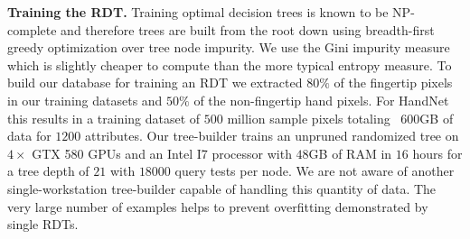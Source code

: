 \documentclass{bmvc2k}
\begin{document}

\textbf{Training the RDT.}
Training optimal decision trees is known to be NP-complete \cite{HyafilR76} and therefore trees are built from the root down using breadth-first greedy optimization over tree node impurity. We use the Gini impurity measure which is slightly cheaper to compute than the more typical entropy measure. To build our database for training an RDT we extracted $80\%$ of the fingertip pixels in our training datasets and $50\%$ of the non-fingertip hand pixels. For HandNet this results in a training dataset of $500$ million sample pixels totaling ~$600$GB of data for $1200$ attributes. Our tree-builder trains an unpruned randomized tree on $4\times$ GTX 580 GPUs and an Intel I7  processor with $48$GB of RAM in $16$ hours for a tree depth of $21$ with $18000$ query tests per node. We are not aware of another single-workstation tree-builder capable of handling this quantity of data. The very large number of examples helps to prevent overfitting demonstrated by single RDTs.

\end{document}

